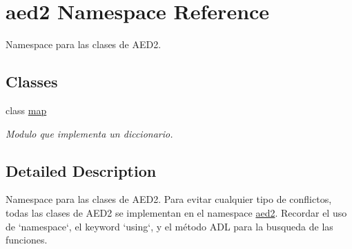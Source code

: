 \hypertarget{namespaceaed2}{\section{aed2 \-Namespace \-Reference}
\label{namespaceaed2}
}


\-Namespace para las clases de \-A\-E\-D2.  


\subsection*{\-Classes}
\begin{DoxyCompactItemize}
\item 
class \hyperlink{classaed2_1_1map}{map}
\begin{DoxyCompactList}\small\item\em \-Modulo que implementa un diccionario. \end{DoxyCompactList}\end{DoxyCompactItemize}


\subsection{\-Detailed \-Description}
\-Namespace para las clases de \-A\-E\-D2. \-Para evitar cualquier tipo de conflictos, todas las clases de \-A\-E\-D2 se implementan en el namespace \hyperlink{namespaceaed2}{aed2}. \-Recordar el uso de `namespace`, el keyword `using`, y el método \-A\-D\-L para la busqueda de las funciones. 